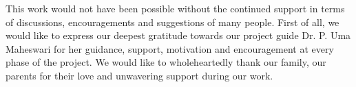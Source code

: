 This work would not have been possible without the continued support in terms of discussions, encouragements and suggestions of many people. First of all, we would like to express our deepest gratitude towards our project guide Dr. P. Uma Maheswari for her guidance, support, motivation and encouragement at every phase of the project. We would like to wholeheartedly thank our family, our parents for their love and unwavering support during our work.
